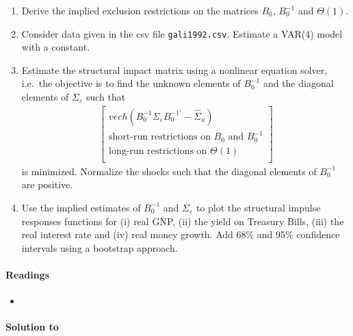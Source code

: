 \begin{enumerate}
	\item Derive the implied exclusion restrictions on the matrices \(B_0\), \(B_0^{-1}\) and \(\Theta(1)\).
	\item Consider data given in the csv file \texttt{gali1992.csv}.
	Estimate a VAR(4) model with a constant.
	\item Estimate the structural impact matrix using a nonlinear equation solver,
	  i.e.\ the objective is to find the unknown elements of \(B_0^{-1}\) and the diagonal elements of \(\Sigma_\varepsilon \) such that
	\begin{align*}
		\begin{bmatrix}
		vech(B_0^{-1} \Sigma_\varepsilon B_0^{-1'}-\hat{\Sigma}_u)\\
		\text{short-run restrictions on~}B_0 \text{~and~} B_0^{-1} \\
		\text{long-run restrictions on~}\Theta(1)\\
	\end{bmatrix}
	\end{align*}
	is minimized.
	Normalize the shocks such that the diagonal elements of \(B_0^{-1}\) are positive.
	\item Use the implied estimates of \(B_0^{-1}\) and \(\Sigma_\varepsilon\) to plot the structural impulse responses functions
	for (i) real GNP, (ii) the yield on Treasury Bills, (iii) the real interest rate and (iv) real money growth.
    Add 68\% and 95\% confidence intervals using a bootstrap approach.
\end{enumerate}

\paragraph{Readings}
\begin{itemize}
	\item \textcite{Gali_1992_HowWellDoes}
\end{itemize}

\begin{solution}\textbf{Solution to }
\ifDisplaySolutions

\fi
\newpage
\end{solution}
